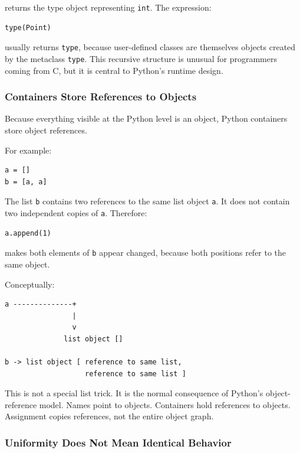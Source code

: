 returns the type object representing \texttt{int}. The expression:

\begin{verbatim}
type(Point)
\end{verbatim}

usually returns \texttt{type}, because user-defined classes are themselves objects created by the metaclass \texttt{type}. This recursive structure is unusual for programmers coming from C, but it is central to Python's runtime design.

\subsubsection*{Containers Store References to Objects}

Because everything visible at the Python level is an object, Python containers store object references.

For example:

\begin{verbatim}
a = []
b = [a, a]
\end{verbatim}

The list \texttt{b} contains two references to the same list object \texttt{a}. It does not contain two independent copies of \texttt{a}. Therefore:

\begin{verbatim}
a.append(1)
\end{verbatim}

makes both elements of \texttt{b} appear changed, because both positions refer to the same object.

Conceptually:

\begin{verbatim}
a --------------+
                |
                v
              list object []

b -> list object [ reference to same list,
                   reference to same list ]
\end{verbatim}

This is not a special list trick. It is the normal consequence of Python's object-reference model. Names point to objects. Containers hold references to objects. Assignment copies references, not the entire object graph.

\subsubsection*{Uniformity Does Not Mean Identical Behavior}

